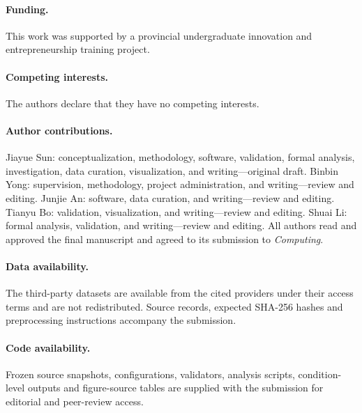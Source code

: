 \documentclass[smallextended]{svjour3}
\begin{document}
\paragraph{Funding.} This work was supported by a provincial undergraduate innovation and entrepreneurship training project.
\paragraph{Competing interests.} The authors declare that they have no competing interests.
\paragraph{Author contributions.} Jiayue Sun: conceptualization, methodology, software, validation, formal analysis, investigation, data curation, visualization, and writing---original draft. Binbin Yong: supervision, methodology, project administration, and writing---review and editing. Junjie An: software, data curation, and writing---review and editing. Tianyu Bo: validation, visualization, and writing---review and editing. Shuai Li: formal analysis, validation, and writing---review and editing. All authors read and approved the final manuscript and agreed to its submission to \textit{Computing}.
\paragraph{Data availability.} The third-party datasets are available from the cited providers under their access terms and are not redistributed. Source records, expected SHA-256 hashes and preprocessing instructions accompany the submission.
\paragraph{Code availability.} Frozen source snapshots, configurations, validators, analysis scripts, condition-level outputs and figure-source tables are supplied with the submission for editorial and peer-review access.

\end{document}
